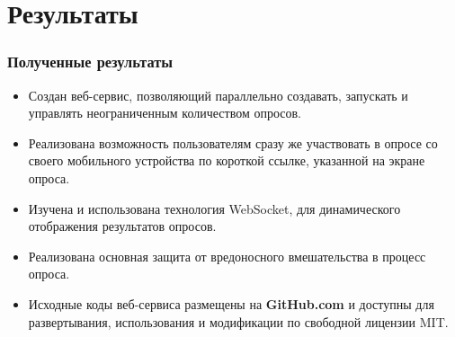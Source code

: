 \documentclass{beamer}
\begin{document}
\begin{frame}
\begin{columns}[c]
\end{columns}
\end{frame}


\section{Результаты}
\begin{frame}
\frametitle{Полученные результаты}
	\begin{itemize}
		\item Создан веб-сервис, позволяющий параллельно создавать, запускать и управлять неограниченным количеством опросов.
		\item Реализована возможность пользователям сразу же участвовать в опросе со своего мобильного устройства по короткой ссылке, указанной на экране опроса.
		\item Изучена и использована технология WebSocket, для динамического отображения результатов опросов.
		\item Реализована основная защита от вредоносного вмешательства в процесс опроса.
		\item Исходные коды веб-сервиса размещены на \textbf{GitHub.com} и доступны для развертывания, использования и модификации по свободной лицензии MIT. 
	\end{itemize}   
\end{frame}
\end{document}
